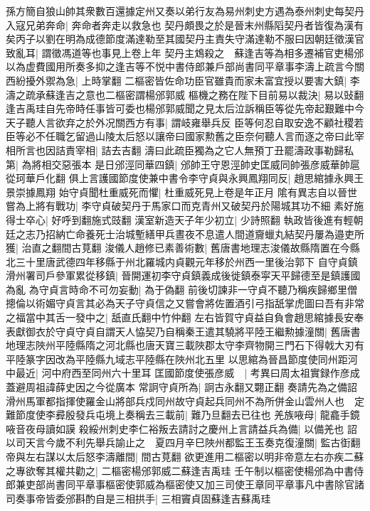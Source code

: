 孫方簡自狼山帥其衆數百還據定州又奏以弟行友為易州刺史方遇為泰州刺史每契丹入寇兄弟奔命|{
	奔命者奔走以救急也}
契丹頗畏之於是晉末州縣䧟契丹者皆復為漢有矣丙子以劉在明為成德節度滿達勒至其國契丹主責失守滿達勒不服曰因朝廷徵漢官致亂耳|{
	謂徵馮道等也事見上卷上年}
契丹主鴆殺之　蘇逢吉等為相多遷補官吏楊邠以為虚費國用所奏多抑之逢吉等不悦中書侍郎兼戶部尚書同平章事李濤上疏言今關西紛擾外禦為急|{
	上時掌翻}
二樞密皆佐命功臣官雖貴而家未富宜授以要害大鎮|{
	李濤之疏承蘇逢吉之意也二樞密謂楊邠郭威}
樞機之務在陛下目前易以裁決|{
	易以䜴翻}
逢吉禹珪自先帝時任事皆可委也楊邠郭威聞之見太后泣訴稱臣等從先帝起艱難中今天子聽人言欲弃之於外况關西方有事|{
	謂岐雍舉兵反}
臣等何忍自取安逸不顧社稷若臣等必不任職乞留過山陵太后怒以讓帝曰國家勲舊之臣奈何聽人言而逐之帝曰此宰相所言也因詰責宰相|{
	詰去吉翻}
濤曰此疏臣獨為之它人無預丁丑罷濤政事勒歸私第|{
	為將相交惡張本}
是日邠涇同華四鎮|{
	邠帥王守恩涇帥史匡威同帥張彦威華帥扈從珂華戶化翻}
俱上言護國節度使兼中書令李守貞與永興鳳翔同反|{
	趙思綰據永興王景崇據鳳翔}
始守貞聞杜重威死而懼|{
	杜重威死見上卷是年正月}
隂有異志自以晉世嘗為上將有戰功|{
	李守貞破契丹于馬家口而克青州又破契丹於陽城其功不細}
素好施得士卒心|{
	好呼到翻施式豉翻}
漢室新造天子年少初立|{
	少詩照翻}
執政皆後進有輕朝廷之志乃招納亡命養死士治城塹繕甲兵晝夜不息遣人間道齎蠟丸結契丹屢為邉吏所獲|{
	治直之翻間古莧翻}
浚儀人趙修已素善術數|{
	舊唐書地理志浚儀故縣隋置在今縣北三十里唐武德四年移縣于州北羅城内貞觀元年移於州西一里後治郭下}
自守貞鎮滑州署司戶參軍累從移鎮|{
	晉開運初李守貞鎮義成後徙鎮泰寜天平歸德至是鎮護國為亂}
為守貞言時命不可勿妄動|{
	為于偽翻}
前後切諫非一守貞不聽乃稱疾歸鄉里僧摠倫以術媚守貞言其必為天子守貞信之又嘗會將佐置酒引弓指舐掌虎圖曰吾有非常之福當中其舌一發中之|{
	舐直氏翻中竹仲翻}
左右皆賀守貞益自負會趙思綰據長安奉表獻御衣於守貞守貞自謂天人恊契乃自稱秦王遣其驍將平陸王繼勲據潼關|{
	舊唐書地理志陜州平陸縣隋之河北縣也唐天寶三載陜郡太守李齊物開三門石下得戟大刃有平陸篆字因改為平陸縣九域志平陸縣在陜州北五里}
以思綰為晉昌節度使同州距河中最近|{
	河中府西至同州六十里耳}
匡國節度使張彦威　|{
	考異曰周太祖實録作彦成蓋避周祖諱薛史因之今從廣本}
常詗守貞所為|{
	詗古永翻又翾正翻}
奏請先為之備詔滑州馬軍都指揮使羅金山將部兵戍同州故守貞起兵同州不為所併金山雲州人也　定難節度使李彛殷發兵屯境上奏稱去三載前|{
	難乃旦翻去已往也}
羌族㖡母|{
	龍龕手鏡㖡音夜母讀如謨}
殺綏州刺史李仁裕叛去請討之慶州上言請益兵為備|{
	以備羌也}
詔以司天言今歲不利先舉兵諭止之　夏四月辛巳陜州都監王玉奏克復潼關|{
	監古衘翻}
帝與左右謀以太后怒李濤離間|{
	間古莧翻}
欲更進用二樞密以明非帝意左右亦疾二蘇之專欲奪其權共勸之|{
	二樞密楊邠郭威二蘇逢吉禹珪}
壬午制以樞密使楊邠為中書侍郎兼吏部尚書同平章事樞密使郭威為樞密使又加三司使王章同平章事凡中書除官諸司奏事帝皆委邠斟酌自是三相拱手|{
	三相竇貞固蘇逢吉蘇禹珪}
